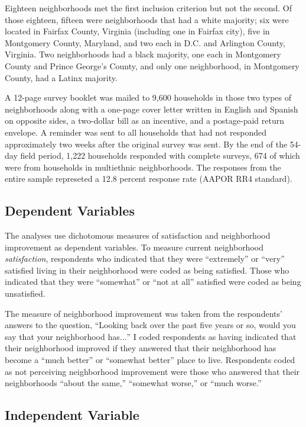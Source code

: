 \documentclass{baderart}
\begin{document}
Eighteen neighborhoods met the first inclusion criterion but not the second. Of those eighteen, fifteen were neighborhoods that had a white majority; six were located in Fairfax County, Virginia (including one in Fairfax city), five in Montgomery County, Maryland, and two each in D.C. and Arlington County, Virginia. Two neighborhoods had a black majority, one each in Montgomery County and Prince George's County, and only one neighborhood, in Montgomery County, had a Latinx majority.

A 12-page survey booklet was mailed to 9,600 households in those two types of neighborhoods along with a one-page cover letter written in English and Spanish on opposite sides, a two-dollar bill as an incentive, and a postage-paid return envelope. A reminder was sent to all households that had not responded approximately two weeks after the original survey was sent. By the end of the 54-day field period, 1,222 households responded with complete surveys, 674 of which were from households in multiethnic neighborhoods. The responses from the entire sample represeted a 12.8 percent response rate (AAPOR RR4 standard).

\subsection{Dependent Variables}\label{dependent-variables}

The analyses use dichotomous measures of satisfaction and neighborhood improvement as dependent variables. To measure current neighborhood \emph{satisfaction}, respondents who indicated that they were ``extremely'' or ``very'' satisfied living in their neighborhood were coded as being satisfied. Those who indicated that they were ``somewhat'' or ``not at all'' satisfied were coded as being unsatisfied.

The measure of neighborhood improvement was taken from the respondents' answers to the question, ``Looking back over the past five years or so, would you say that your neighborhood has\(\ldots\)'' I coded respondents as having indicated that their neighborhood improved if they answered that their neighborhood has become a ``much better'' or ``somewhat better'' place to live. Respondents coded as not perceiving neighborhood improvement were those who answered that their neighborhoods ``about the same,'' ``somewhat worse,'' or ``much worse.''

\subsection{Independent Variable}\label{independent-variable}
\end{document}
